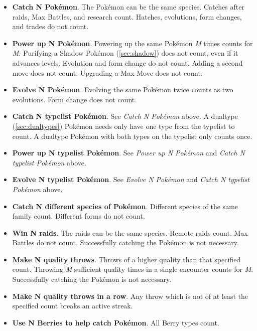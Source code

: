 \begin{itemize}
  \item \textbf{Catch \textup{N} Pokémon}. The Pokémon can be the same species.
    Catches after raids, Max Battles, and research count.
    Hatches, evolutions, form changes, and trades do not count.
  \item \textbf{Power up \textup{N} Pokémon}. Powering up the same Pokémon \textit{M} times counts for \textit{M}.
     Purifying a Shadow Pokémon (\autoref{sec:shadow}) does not count, even if it advances levels.
     Evolution and form change do not count. Adding a second move does not count. Upgrading a Max Move
     does not count.
   \item \textbf{Evolve \textup{N} Pokémon}.
      Evolving the same Pokémon twice counts as two evolutions.
      Form change does not count.
    \item \textbf{Catch \textup{N typelist} Pokémon}. See \textit{Catch \textup{N} Pokémon} above.
      A dualtype (\autoref{sec:dualtypes}) Pokémon needs only have one type from the typelist
       to count. A dualtype Pokémon with both types on the typelist only counts once.
     \item \textbf{Power up \textup{N typelist} Pokémon}. See \textit{Power up \textup{N} Pokémon}
       and \textit{Catch \textup{N typelist} Pokémon} above.
     \item \textbf{Evolve \textup{N typelist} Pokémon}. See \textit{Evolve \textup{N} Pokémon}
       and \textit{Catch \textup{N typelist} Pokémon} above.
  \item \textbf{Catch \textup{N} different species of Pokémon}.
    Different species of the same family count.
    Different forms do not count.
  \item \textbf{Win \textup{N} raids}. The raids can be the same species.
      Remote raids count.
      Max Battles do not count.
      Successfully catching the Pokémon is not necessary.
  \item \textbf{Make \textup{N quality} throws}.
      Throws of a higher quality than that specified count.
      Throwing \textit{M} sufficient quality times in a single encounter counts for \textit{M}.
      Successfully catching the Pokémon is not necessary.
  \item \textbf{Make \textup{N quality} throws in a row}.
      Any throw which is not of at least the specified count breaks an active streak.
  \item \textbf{Use \textup{N} Berries to help catch Pokémon}.
      All Berry types count.

\end{itemize}

